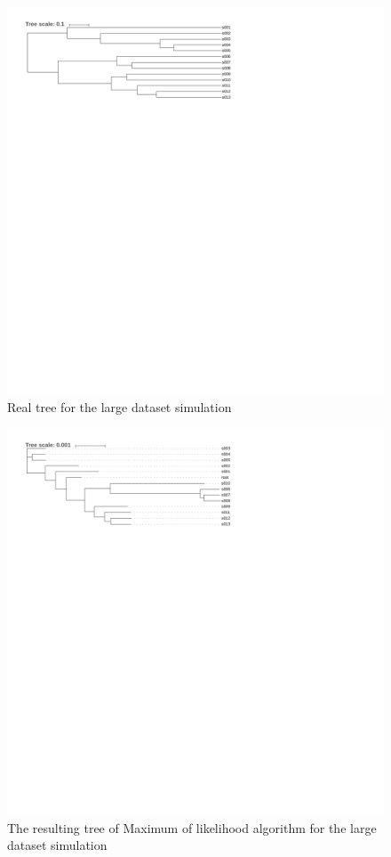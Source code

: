 \documentclass[]{article}
\theoremstyle{definition}
\begin{document}
\begin{figure}[H]
	\includegraphics*[width = \linewidth]{image/big_sim_tree_true.pdf}
	\caption{ Real tree for the large dataset simulation }
\end{figure}

\begin{figure}[H]
	\includegraphics*[width = \linewidth]{image/big_sim_tree_MLGO.pdf}
	\caption{The resulting tree of Maximum of likelihood algorithm for the large dataset simulation }
\end{figure}
\end{document}
